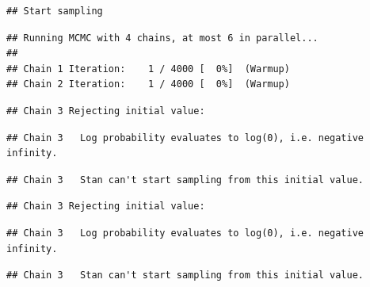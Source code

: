 \documentclass[
]{article}
\begin{document}
\begin{verbatim}
## Start sampling
\end{verbatim}

\begin{verbatim}
## Running MCMC with 4 chains, at most 6 in parallel...
## 
## Chain 1 Iteration:    1 / 4000 [  0%]  (Warmup) 
## Chain 2 Iteration:    1 / 4000 [  0%]  (Warmup)
\end{verbatim}

\begin{verbatim}
## Chain 3 Rejecting initial value:
\end{verbatim}

\begin{verbatim}
## Chain 3   Log probability evaluates to log(0), i.e. negative infinity.
\end{verbatim}

\begin{verbatim}
## Chain 3   Stan can't start sampling from this initial value.
\end{verbatim}

\begin{verbatim}
## Chain 3 Rejecting initial value:
\end{verbatim}

\begin{verbatim}
## Chain 3   Log probability evaluates to log(0), i.e. negative infinity.
\end{verbatim}

\begin{verbatim}
## Chain 3   Stan can't start sampling from this initial value.
\end{verbatim}
\end{document}
